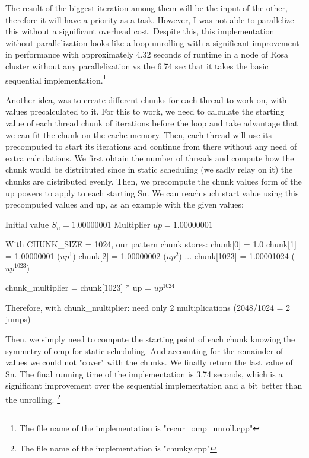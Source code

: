 \documentclass[unicode,11pt,a4paper,oneside,numbers=endperiod,openany]{scrartcl}
\begin{document}
The result of the biggest iteration among them will be the input of the other, therefore it will have
a priority as a task.
However, I was not able to parallelize this without a significant overhead cost. Despite this, 
this implementation without parallelization looks like a loop unrolling with a significant improvement in performance
with approximately 4.32 seconds of runtime in a node of Rosa cluster without any parallelization vs the 6.74 sec that it takes 
the basic sequential implementation.\footnote{The file name of the implementation is "recur\_omp\_unroll.cpp"}

Another idea, was to create different chunks for each thread to work on, with values precalculated to it. For this to work, we need to calculate the
starting value of each thread chunk of iterations before the loop and take advantage that we can fit the chunk on the cache memory. 
Then, each thread will use its precomputed to start its iterations and continue from there without any need of extra calculations. 
We first obtain the number of threads and compute how the chunk would be distributed since in static scheduling (we sadly relay on it)
the chunks are distributed evenly. Then, we precompute the chunk values form of the up powers to apply to each starting Sn.
We can reach such start value using this precomputed values and up, as an example with the given values:

Initial value $S_n = 1.00000001$
Multiplier $up = 1.00000001$

With CHUNK\_SIZE = 1024, our pattern chunk stores:
chunk[0] = 1.0 
chunk[1] = 1.00000001    ($up^1$)
chunk[2] = 1.00000002    ($up^2$)
...
chunk[1023] = 1.00001024 ($up^{1023}$)

chunk\_multiplier = chunk[1023] * up = $up^{1024}$

Therefore, with chunk\_multiplier: need only 2 multiplications (2048/1024 = 2 jumps)

Then, we simply need to compute the starting point of each chunk knowing the symmetry of omp for static scheduling.
And accounting for the remainder of values we could not "cover" with the chunks. We finally return the last value of Sn. 
The final running time of the implementation is 3.74 seconds, which is a significant improvement over the sequential implementation
and a bit better than the unrolling. \footnote{The file name of the implementation is "chunky.cpp"}
\end{document}
